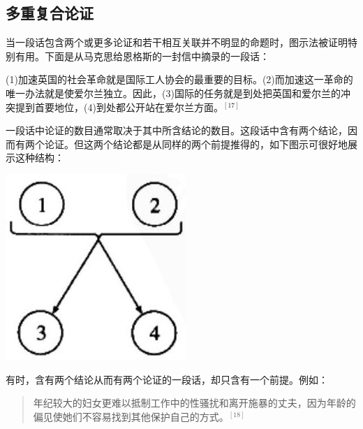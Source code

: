 \subsection{多重复合论证}

当一段话包含两个或更多论证和若干相互关联并不明显的命题时，图示法被证明特别有用。下面是从马克思给恩格斯的一封信中摘录的一段话：

\begin{displayquote}
(1)加速英国的社会革命就是国际工人协会的最重要的目标。(2)而加速这一革命的唯一办法就是使爱尔兰独立。因此，(3)国际的任务就是到处把英国和爱尔兰的冲突提到首要地位，(4)到处都公开站在爱尔兰方面。${}^{[17]}$
\end{displayquote}

一段话中论证的数目通常取决于其中所含结论的数目。这段话中含有两个结论，因而有两个论证。但这两个结论都是从同样的两个前提推得的，如下图示可很好地展示这种结构：

\begin{center}
\includegraphics[width=\textwidth]{images/2025_05_15_6a28331d5e7c993ad07ag-032.jpg}
\end{center}

有时，含有两个结论从而有两个论证的一段话，却只含有一个前提。例如：

\begin{quotation}
年纪较大的妇女更难以抵制工作中的性骚扰和离开施暴的丈夫，因为年龄的偏见使她们不容易找到其他保护自己的方式。${}^{[18]}$
\end{quotation}

